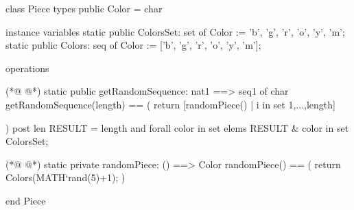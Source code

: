 \begin{vdmpp}[breaklines=true]
class Piece
types
   public Color = char  

instance variables
   static public ColorsSet: set of Color := {'b', 'g', 'r', 'o', 'y', 'm'};
   static public Colors: seq of Color := ['b', 'g', 'r', 'o', 'y', 'm'];
   
operations
   
(*@
\label{getRandomSequence:11}
@*)
  static public getRandomSequence: nat1 ==> seq1 of char
    getRandomSequence(length) == (
    return [randomPiece() | i in set {1,...,length}]

  )
  post len RESULT = length and
    forall color in set elems RESULT & color in set ColorsSet;


(*@
\label{randomPiece:20}
@*)
  static private randomPiece: () ==> Color
  randomPiece() == (
  return Colors(MATH`rand(5)+1);
  )

end Piece
\end{vdmpp}
